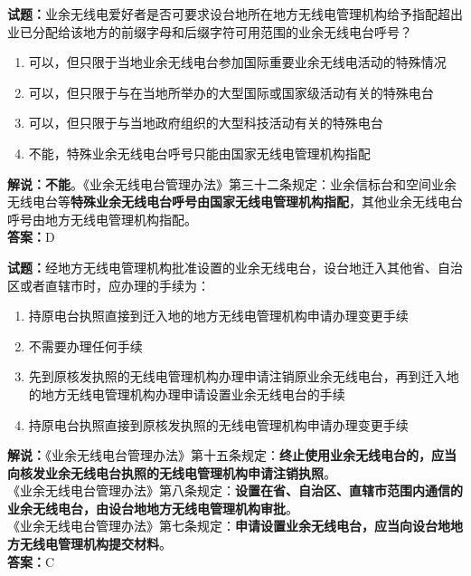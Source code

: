 \documentclass{ctexbook}
\begin{document}
\bigskip

\noindent\textbf{试题：}业余无线电爱好者是否可要求设台地所在地方无线电管理机构给予指配超出业已分配给该地方的前缀字母和后缀字符可用范围的业余无线电台呼号？
\begin{enumerate}[leftmargin=3em]
  \item 可以，但只限于当地业余无线电台参加国际重要业余无线电活动的特殊情况
  \item 可以，但只限于与在当地所举办的大型国际或国家级活动有关的特殊电台
  \item 可以，但只限于与当地政府组织的大型科技活动有关的特殊电台
  \item 不能，特殊业余无线电台呼号只能由国家无线电管理机构指配
\end{enumerate}
\textbf{解说：不能}。《业余无线电台管理办法》第三十二条规定：业余信标台和空间业余无线电台等\textbf{特殊业余无线电台呼号由国家无线电管理机构指配}，其他业余无线电台呼号由地方无线电管理机构指配。\\\noindent\textbf{答案：}D

\bigskip

\noindent\textbf{试题：}经地方无线电管理机构批准设置的业余无线电台，设台地迁入其他省、自治区或者直辖市时，应办理的手续为：
\begin{enumerate}[leftmargin=3em]
  \item 持原电台执照直接到迁入地的地方无线电管理机构申请办理变更手续
  \item 不需要办理任何手续
  \item 先到原核发执照的无线电管理机构办理申请注销原业余无线电台，再到迁入地的地方无线电管理机构办理申请设置业余无线电台的手续
  \item 持原电台执照直接到原核发执照的无线电管理机构申请办理变更手续
\end{enumerate}
\noindent\textbf{解说：}《业余无线电台管理办法》第十五条规定：\textbf{终止使用业余无线电台的，应当向核发业余无线电台执照的无线电管理机构申请注销执照}。\\
《业余无线电台管理办法》第八条规定：\textbf{设置在省、自治区、直辖市范围内通信的业余无线电台，由设台地地方无线电管理机构审批}。\\
《业余无线电台管理办法》第七条规定：\textbf{申请设置业余无线电台，应当向设台地地方无线电管理机构提交材料}。\\\noindent\textbf{答案：}C

\bigskip
\end{document}
